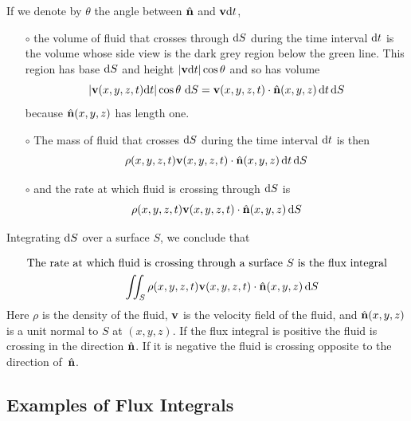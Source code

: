 If we denote by $\theta$ the angle between $\hat{\mathbf{n}}$ and $\mathbf{v}\mathrm{d}t$,
\begin{itemize}\itemsep1pt \parskip0pt  %
\item[$\circ$] 
the volume of fluid that crosses through $\mathrm{d}S$ during the time 
interval $\mathrm{d}t$ is the volume  whose side view is the dark grey 
region below the green line. This region has base $\mathrm{d}S$ and 
height $|\mathbf{v}\mathrm{d}t|\cos\theta$ and so has volume
\begin{equation*}
|\mathbf{v}(x,y,z,t)\mathrm{d}t|\cos\theta\ \mathrm{d}S
   =\mathbf{v}(x,y,z,t)\cdot\hat{\mathbf{n}}(x,y,z)\,\mathrm{d}t\,\mathrm{d}S
\end{equation*}
because $\hat{\mathbf{n}}(x,y,z)$ has length one. 
\item[$\circ$]
 The mass of fluid that crosses $\mathrm{d}S$ during the time interval $\mathrm{d}t$
 is then 
\begin{equation*}
\rho(x,y,z,t)\mathbf{v}(x,y,z,t)\cdot\hat{\mathbf{n}}(x,y,z)\,\mathrm{d}t\,\mathrm{d}S
\end{equation*}
\item[$\circ$]
and the rate at which fluid is crossing through $\mathrm{d}S$ is
\begin{equation*}
\rho(x,y,z,t)\mathbf{v}(x,y,z,t)\cdot\hat{\mathbf{n}}(x,y,z)\,\mathrm{d}S
\end{equation*}
\end{itemize}
Integrating $\mathrm{d}S$ over a surface $S$, we conclude that
\begin{lemma}\label{lem:fluxInterp}
\begin{align*}
&\text{The rate at which fluid is crossing through a surface $S$ is the flux integral}\\
&\hskip1.2in
\iint_S \rho(x,y,z,t)\mathbf{v}(x,y,z,t)\cdot\hat{\mathbf{n}}(x,y,z)\,\mathrm{d}S
\end{align*}
Here $\rho$ is the density of the fluid, $\mathbf{v}$ is
the velocity field of the fluid, and $\hat{\mathbf{n}}(x,y,z)$ is a unit normal 
to $S$ at $(x,y,z)$.
If the flux integral is positive the fluid is crossing in the direction 
$\hat{\mathbf{n}}$. If it is negative the fluid is crossing opposite to the direction 
of~$\hat{\mathbf{n}}$.
\end{lemma}

\subsection{Examples of Flux Integrals}\label{sec:fluxEexamples}


